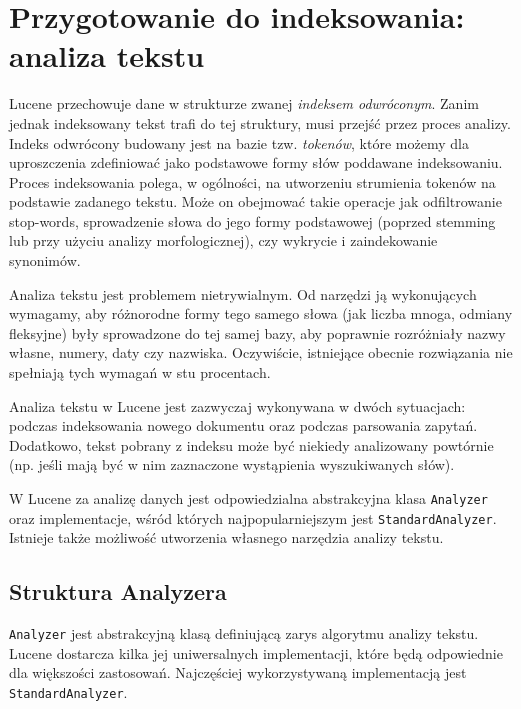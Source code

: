 \chapter{Przygotowanie do indeksowania: analiza tekstu}

Lucene przechowuje dane w strukturze zwanej \emph{indeksem odwróconym}. Zanim jednak indeksowany tekst trafi do tej struktury, musi przejść przez proces analizy. Indeks odwrócony budowany jest na bazie tzw. \emph{tokenów}, które możemy dla uproszczenia zdefiniować jako podstawowe formy słów poddawane indeksowaniu. Proces indeksowania polega, w ogólności, na utworzeniu strumienia tokenów na podstawie zadanego tekstu. Może on obejmować takie operacje jak odfiltrowanie stop-words, sprowadzenie słowa do jego formy podstawowej (poprzed stemming lub przy użyciu analizy morfologicznej), czy wykrycie i zaindekowanie synonimów. 

Analiza tekstu jest problemem nietrywialnym. Od narzędzi ją wykonujących wymagamy, aby różnorodne formy tego samego słowa (jak liczba mnoga, odmiany fleksyjne) były sprowadzone do tej samej bazy, aby poprawnie rozróżniały nazwy własne, numery, daty czy nazwiska. Oczywiście, istniejące obecnie rozwiązania nie spełniają tych wymagań w stu procentach.

Analiza tekstu w Lucene jest zazwyczaj wykonywana w dwóch sytuacjach: podczas indeksowania nowego dokumentu oraz podczas parsowania zapytań. Dodatkowo, tekst pobrany z indeksu może być niekiedy analizowany powtórnie (np. jeśli mają być w nim zaznaczone wystąpienia wyszukiwanych słów).

W Lucene za analizę danych jest odpowiedzialna abstrakcyjna klasa \texttt{Analyzer} oraz implementacje, wśród których najpopularniejszym jest \texttt{StandardAnalyzer}. Istnieje także możliwość utworzenia własnego narzędzia analizy tekstu. 

\section{Struktura Analyzera}

\texttt{Analyzer} jest abstrakcyjną klasą definiującą zarys algorytmu analizy tekstu. Lucene dostarcza kilka jej uniwersalnych implementacji, które będą odpowiednie dla większości zastosowań. Najczęściej wykorzystywaną implementacją jest \texttt{StandardAnalyzer}.

